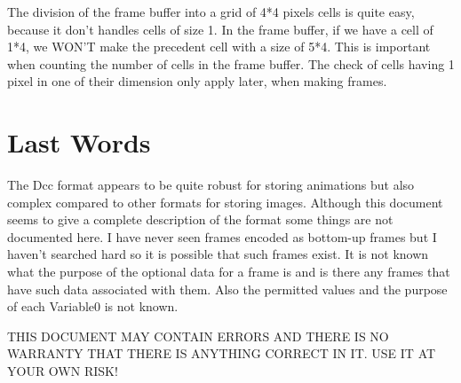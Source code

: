 The division of the frame buffer into a grid of 4*4 pixels cells is quite easy, because it don't handles cells of size 1. In the frame buffer, if we have a cell of 1*4, we WON'T make the precedent cell with a size of 5*4. This is important when counting the number of cells in the frame buffer. The check of cells having 1 pixel in one of their dimension only apply later, when making frames.


\section{Last Words}
The Dcc format appears to be quite robust for storing animations but also complex compared to other formats for storing images. Although this document seems to give a complete description of the format some things are not documented here. I have never seen frames encoded as bottom-up frames but I haven't searched hard so it is possible that such frames exist. It is not known what the purpose of the optional data for a frame is and is there any frames that have such data associated with them. Also the permitted values and the purpose of each Variable0 is not known.

THIS DOCUMENT MAY CONTAIN ERRORS AND THERE IS NO WARRANTY THAT THERE IS ANYTHING CORRECT IN IT. USE IT AT YOUR OWN RISK!


